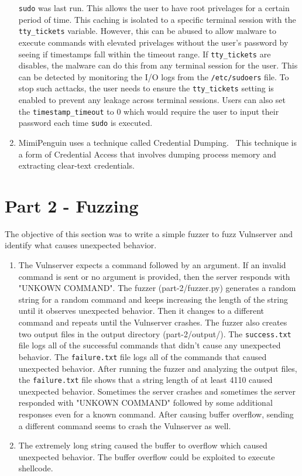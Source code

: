 \documentclass[11pt]{article}
\begin{document}
\begin{enumerate}
  \verb|sudo| was last run. This allows the user to have root privelages for a certain period of time.
  This caching is isolated to a specific terminal session with the \verb|tty_tickets| variable.
  However, this can be abused to allow malware to execute commands with elevated privelages without
  the user's password by seeing if timestamps  fall within the timeout range. If \verb|tty_tickets|
  are disables, the malware can do this from any terminal session for the user. This can be detected
  by monitoring the I/O logs from the \verb|/etc/sudoers| file. To stop such acttacks,
  the user needs to ensure the \verb|tty_tickets| setting is enabled to prevent any leakage across
  terminal sessions. Users can also set the \verb|timestamp_timeout| to 0 which would require the
  user to input their password each time \verb|sudo| is executed.~\cite{sudo-caching}
  \item MimiPenguin uses a technique called Credential Dumping.~\cite{mimipenguin}
  This technique is a form of Credential Access that involves dumping process memory and
  extracting clear-text credentials.~\cite{credential-dumping}
\end{enumerate}

\section*{Part 2 - Fuzzing}
\label{sec:part-2}
The objective of this section was to write a simple fuzzer to fuzz Vulnserver and identify
what causes unexpected behavior.

\begin{enumerate}
  \item The Vulnserver expects a command followed by an argument. If an invalid command is sent or
  no argument is provided, then the server responds with "UNKOWN COMMAND". The fuzzer (part-2/fuzzer.py) generates
  a random string for a random command and keeps increasing the length of the string until it observes
  unexpected behavior. Then it changes to a different command and repeats until the Vulnserver crashes.
  The fuzzer also creates two output files in the output directory (part-2/output/). The \verb|success.txt| file
  logs all of the successful commands that didn't cause any unexpected behavior. The \verb|failure.txt|
  file logs all of the commands that caused unexpected behavior. After running the fuzzer
  and analyzing the output files, the \verb|failure.txt| file shows that a string length of at least 4110
  caused unexpected behavior. Sometimes the server crashes and sometimes the server responded with
  "UNKOWN COMMAND" followed by some additional responses even for a known command. After causing buffer overflow,
  sending a different command seems to crash the Vulnserver as well.
  \item The extremely long string caused the buffer to overflow which caused unexpected behavior.
  The buffer overflow could be exploited to execute shellcode.
\end{enumerate}
\end{document}
